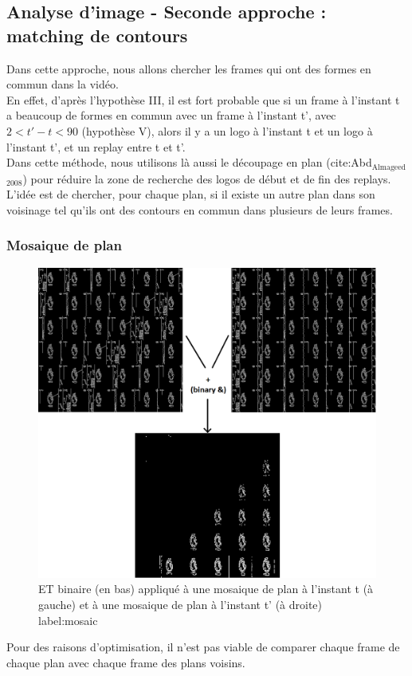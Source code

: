 \documentclass[11pt]{article}
\begin{document}
\subsection{Analyse d'image - Seconde approche : matching de contours}
\label{sec:orgb779e19}
Dans cette approche, nous allons chercher les frames qui ont des formes en commun dans la vidéo.\\
En effet, d'après l'hypothèse III, il est fort probable que si un frame à l'instant t a beaucoup de formes en commun avec un frame à l'instant t', avec \(2 < t' - t < 90\) (hypothèse V), alors il y a un logo à l'instant t et un logo à l'instant t', et un replay entre t et t'.\\

Dans cette méthode, nous utilisons là aussi le découpage en plan (cite:Abd\(_{\text{Almageed}}\)\(_{\text{2008}}\)) pour réduire la zone de recherche des logos de début et de fin des replays.\\

L'idée est de chercher, pour chaque plan, si il existe un autre plan dans son voisinage tel qu'ils ont des contours en commun dans plusieurs de leurs frames.\\


\subsubsection{Mosaique de plan}
\label{sec:org7c4515c}
\begin{figure}[htbp]
\centering
\includegraphics[width=16cm]{mosaique_add.png}
\caption{ET binaire (en bas) appliqué à une mosaique de plan à l'instant t (à gauche) et à une mosaique de plan à l'instant t' (à droite) label:mosaic}
\end{figure}
Pour des raisons d'optimisation, il n'est pas viable de comparer chaque frame de chaque plan avec chaque frame des plans voisins.\\
\end{document}
